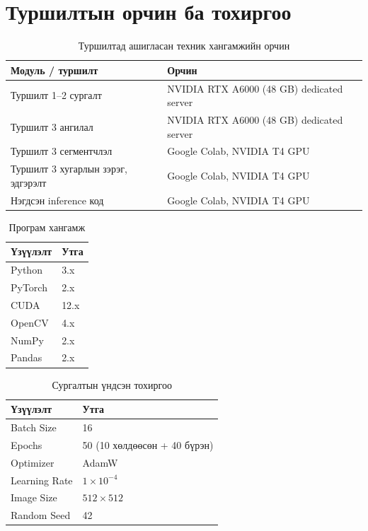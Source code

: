 
\chapter{Туршилтын орчин ба тохиргоо}
\label{AppendixH}
\pagecolor{white}

\begin{table}[ht]
    \centering
    \begin{tabular}{|l|l|}
    \hline
    \textbf{Модуль / туршилт} & \textbf{Орчин} \\ \hline
    Туршилт 1--2 сургалт & NVIDIA RTX A6000 (48 GB) dedicated server \\ \hline
    Туршилт 3 ангилал & NVIDIA RTX A6000 (48 GB) dedicated server \\ \hline
    Туршилт 3 сегментчлэл & Google Colab, NVIDIA T4 GPU \\ \hline
    Туршилт 3 хугарлын зэрэг, эдгэрэлт & Google Colab, NVIDIA T4 GPU \\ \hline
    Нэгдсэн inference код & Google Colab, NVIDIA T4 GPU \\ \hline
    \end{tabular}
    \caption{Туршилтад ашигласан техник хангамжийн орчин}
    \label{tab:appH_hw}
\end{table}

\begin{table}[ht]
    \centering
    \begin{tabular}{|l|l|}
    \hline
    \textbf{Үзүүлэлт} & \textbf{Утга} \\ \hline
    Python  & 3.x \\ \hline
    PyTorch & 2.x \\ \hline
    CUDA    & 12.x \\ \hline
    OpenCV  & 4.x \\ \hline
    NumPy   & 2.x \\ \hline
    Pandas  & 2.x \\ \hline
    \end{tabular}
    \caption{Програм хангамж}
    \label{tab:appH_sw}
\end{table}

\begin{table}[ht]
    \centering
    \begin{tabular}{|l|l|}
    \hline
    \textbf{Үзүүлэлт} & \textbf{Утга} \\ \hline
    Batch Size    & 16 \\ \hline
    Epochs        & 50 (10 хөлдөөсөн + 40 бүрэн) \\ \hline
    Optimizer     & AdamW \\ \hline
    Learning Rate & $1\times10^{-4}$ \\ \hline
    Image Size    & $512\times512$ \\ \hline
    Random Seed   & 42 \\ \hline
    \end{tabular}
    \caption{Сургалтын үндсэн тохиргоо}
    \label{tab:appH_train}
\end{table}
